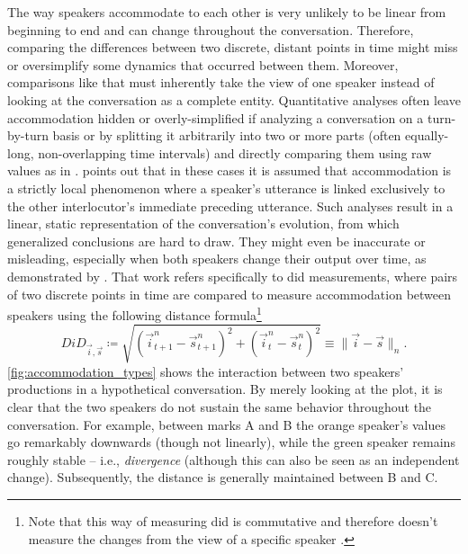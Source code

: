 The way speakers accommodate to each other is very unlikely to be linear from beginning to end and can change throughout the conversation.
Therefore, comparing the differences between two discrete, distant points in time might miss or oversimplify some dynamics that occurred between them.
Moreover, comparisons like that must inherently take the view of one speaker instead of looking at the conversation as a complete entity.
Quantitative analyses often leave accommodation hidden or overly-simplified if analyzing a conversation on a turn-by-turn basis or by splitting it arbitrarily into two or more parts (often equally-long, non-overlapping time intervals) and directly comparing them using raw values as in \citet{Heldner2010pitch, Rahimi2018weighting, Ibrahim2019fundamental}.
\citet[][p.~15]{DeLooze2014investigating} points out that in these cases it is assumed that accommodation is a strictly local phenomenon where a speaker's utterance is linked exclusively to the other interlocutor's immediate preceding utterance.
Such analyses result in a linear, static representation of the conversation's evolution, from which generalized conclusions are hard to draw.
They might even be inaccurate or misleading, especially when both speakers change their output over time, as demonstrated by \citet{CohenPriva2019limitations}.
That work refers specifically to \ac{did} measurements, where pairs of two discrete points in time are compared to measure accommodation between speakers using the following distance formula\footnote{Note that this way of measuring \ac{did} is commutative and therefore doesn't measure the changes from the view of a specific speaker \citep[unlike,~e.g.,][p.~3]{CohenPriva2019limitations}.}
%
\begin{equation}
	\label{eq:did}
	DiD_{\vec{i},\vec{s}} \coloneqq \sqrt{(\vec{i}_{t + 1}^n - \vec{s}_{t + 1}^n)^2 + (\vec{i}_t^n - \vec{s}_t^n)^2} \equiv \lVert \vec{i} - \vec{s} \rVert_n.
\end{equation}
\noindent
%
\cref{fig:accommodation_types} shows the interaction between two speakers' productions in a hypothetical conversation.
By merely looking at the plot, it is clear that the two speakers do not sustain the same behavior throughout the conversation.
For example, between marks A and B the orange speaker's values go remarkably downwards (though not linearly), while the green speaker remains roughly stable -- i.e., \emph{divergence} (although this can also be seen as an independent change).
Subsequently, the distance is generally maintained between B and C.
